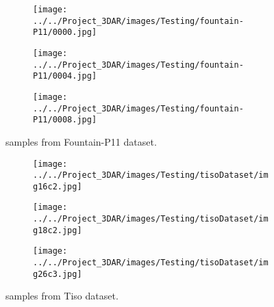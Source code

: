 \begin{figure}[H]
     \centering
     \begin{subfigure}[b]{0.3\textwidth}
         \centering
         \texttt{[image: ../../Project\_3DAR/images/Testing/fountain-P11/0000.jpg]}
     \end{subfigure}
     \hfill
     \begin{subfigure}[b]{0.3\textwidth}
         \centering
         \texttt{[image: ../../Project\_3DAR/images/Testing/fountain-P11/0004.jpg]}
     \end{subfigure}
     \hfill
     \begin{subfigure}[b]{0.3\textwidth}
         \centering
         \texttt{[image: ../../Project\_3DAR/images/Testing/fountain-P11/0008.jpg]}
     \end{subfigure}
        \caption{samples from Fountain-P11 dataset.}
        \label{fig:fountain}
\end{figure}

\begin{figure}[H]
     \centering
     \begin{subfigure}[b]{0.3\textwidth}
         \centering
         \texttt{[image: ../../Project\_3DAR/images/Testing/tisoDataset/img16c2.jpg]}
     \end{subfigure}
     \hfill
     \begin{subfigure}[b]{0.3\textwidth}
         \centering
         \texttt{[image: ../../Project\_3DAR/images/Testing/tisoDataset/img18c2.jpg]}
     \end{subfigure}
     \hfill
     \begin{subfigure}[b]{0.3\textwidth}
         \centering
         \texttt{[image: ../../Project\_3DAR/images/Testing/tisoDataset/img26c3.jpg]}
     \end{subfigure}
        \caption{samples from Tiso dataset.}
        \label{fig:tiso}
\end{figure}

